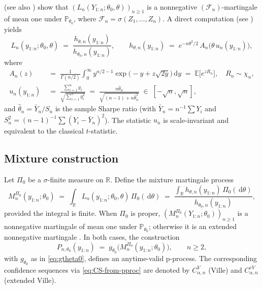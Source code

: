 \documentclass{article}%
\newcommand{\R}{\mathbb{R}}
\newcommand{\E}{\mathbb{E}}
\newcommand{\Prob}{\mathbb{P}}
\newcommand{\dd}{\,\mathrm{d}}
\begin{document}
\cite[Cor.~4.6]{Wang2025} (see also
\citealp[Eq.~(5)--(6)]{PerezOrtiz2024}) show that
\((L_n(Y_{1:n};\theta_0,\theta))_{n\geq 1}\) is a nonnegative
\((\mathcal F_n)\)-martingale of mean one under
\(\Prob_{\theta_0}\), where \(\mathcal F_n=\sigma(Z_1,\ldots,Z_n)\). A
direct computation (see \citealp[Sec.~4.4]{Wang2025}) yields
\begin{equation}\label{eq:hthetadef}
  L_n(y_{1:n};\theta_0,\theta)
  \;=\;\frac{h_{\theta,n}(y_{1:n})}{h_{\theta_0,n}(y_{1:n})},
  \qquad
  h_{\theta,n}(y_{1:n}) \;=\; e^{-n\theta^2/2}\,A_n\bigl(\theta\,u_n(y_{1:n})\bigr),
\end{equation}
where
\begin{align}
  A_n(z) &\;=\;\frac{1}{\Gamma(n/2)}\int_0^\infty y^{n/2-1}
                \exp\!\bigl(-y+z\sqrt{2y}\bigr)\dd y
              \;=\; \E\bigl[e^{z R_n}\bigr],\quad R_n\sim\chi_n,
              \label{eq:Andef}\\[2pt]
  u_n(y_{1:n})
       &\;=\;\frac{\sum_{i=1}^n y_i}{\sqrt{\sum_{i=1}^n y_i^2}}
       \;=\;\frac{n\widehat\theta_n}{\sqrt{(n-1)+n\widehat\theta_n^2}}
       \;\in\;[-\sqrt n,\sqrt n],
       \label{eq:undef}
\end{align}
and \(\widehat\theta_n=\bar Y_n/S_n\) is the sample Sharpe ratio
(with \(\bar Y_n=n^{-1}\sum Y_i\) and
\(S_n^2=(n-1)^{-1}\sum(Y_i-\bar Y_n)^2\)).
The statistic \(u_n\) is scale-invariant and equivalent to the
classical \(t\)-statistic.

\subsection{Mixture construction}\label{ssec:mixture}

Let \(\Pi_0\) be a \(\sigma\)-finite measure on \(\R\). Define the
mixture martingale process
\begin{equation}\label{eq:Mn-def}
  M_n^{\Pi_0}(y_{1:n};\theta_0)
  \;=\;\int_\R L_n(y_{1:n};\theta_0,\theta)\,\Pi_0(\dd\theta)
  \;=\;\frac{\int_\R h_{\theta,n}(y_{1:n})\,\Pi_0(\dd\theta)}
            {h_{\theta_0,n}(y_{1:n})},
\end{equation}
provided the integral is finite. When \(\Pi_0\) is proper,
\((M_n^{\Pi_0}(Y_{1:n};\theta_0))_{n\geq 1}\) is a nonnegative
martingale of mean one under \(\Prob_{\theta_0}\); otherwise it is an extended nonnegative martingale \citep{wang2025extended}. In both
cases, the construction
\begin{equation}\label{eq:p-from-M}
  P_{n,\theta_0}(y_{1:n})
  \;=\;
  g_{\theta_0}\!\bigl(M_n^{\Pi_0}(y_{1:n};\theta_0)\bigr),
  \qquad n\geq 2,
\end{equation}
with \(g_{\theta_0}\) as in \eqref{eq:gtheta0}, defines an anytime-valid
p-process. The corresponding confidence sequences via
\eqref{eq:CS-from-pproc} are denoted by \(C^V_{\alpha,n}\) (Ville) and
\(C^{eV}_{\alpha,n}\) (extended Ville).
\end{document}
